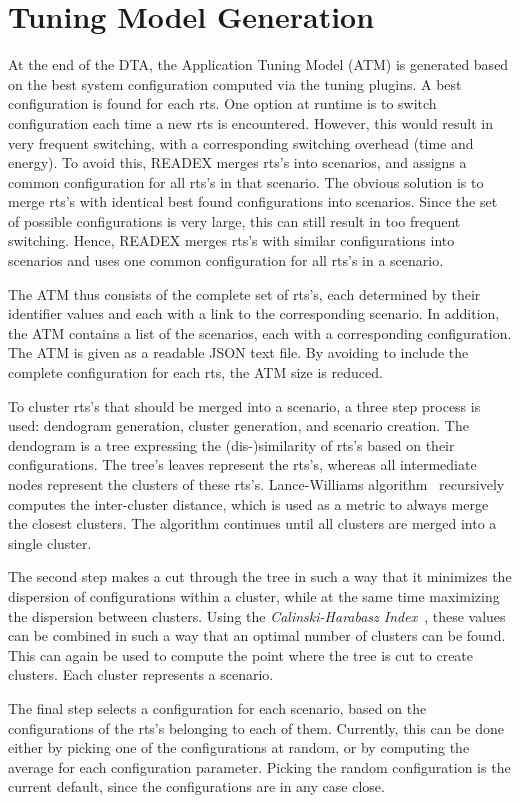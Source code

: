 \section{Tuning Model Generation} \label{tm-generation}

At the end of the DTA, the Application Tuning Model (ATM) is generated based on the best system configuration computed via the tuning plugins. A best configuration is found for each rts. One option at runtime is to switch configuration each time a new rts is encountered. However, this would result in very frequent switching, with a 
corresponding switching overhead (time and energy). To avoid this, READEX merges rts's into scenarios, and assigns a common configuration for all rts's in that scenario. The obvious solution is to merge rts's with identical best found configurations into scenarios. Since the set of possible configurations is very large, this can still result in too frequent switching. Hence, READEX merges rts's with similar configurations into scenarios and uses one common configuration for all rts's in a scenario.

The ATM thus consists of the complete set of rts's, each determined by their 
identifier values and each with a link to the corresponding scenario. In 
addition, the ATM contains a list of the scenarios, each with a corresponding 
configuration. The ATM is given as a readable JSON text file. By avoiding to 
include the complete configuration for each rts, the ATM size is reduced. 

To cluster rts's that should be merged into a scenario, a three step process is 
used: dendogram generation, cluster generation, and scenario creation. The 
dendogram is a tree expressing the (dis-)similarity of rts's based on their 
configurations. The tree's leaves represent the rts's, whereas all intermediate 
nodes represent the clusters of these rts's. Lance-Williams algorithm~
\cite{Lance1967} recursively computes the inter-cluster distance, which is used 
as a metric to always merge the closest clusters. The algorithm continues until 
all clusters are merged into a single cluster. 

The second step makes a cut through the tree in such a way that it minimizes the dispersion of configurations within a cluster, while at the same time maximizing the dispersion between clusters. Using the \emph{Calinski-Harabasz Index}~\cite{Calinski1974}, these values can be combined in such a way that an optimal number of clusters can be found. This can again be used to compute the point where the tree is cut to create clusters. Each cluster represents a scenario.

The final step selects a configuration for each scenario, based on the 
configurations of the rts's belonging to each of them. Currently, this can be 
done either by picking one of the configurations at random, or by computing the 
average for each configuration parameter. Picking the random configuration is 
the current default, since the configurations are in any case close.